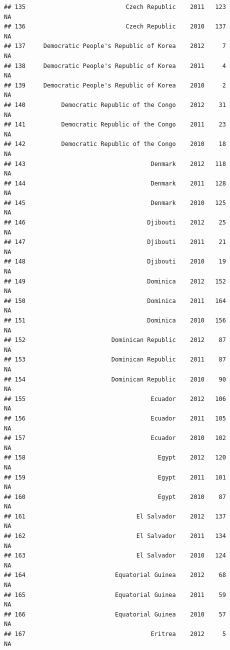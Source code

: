 \documentclass[
]{book}
\begin{document}
\begin{verbatim}
## 135                            Czech Republic    2011   123              NA
## 136                            Czech Republic    2010   137              NA
## 137     Democratic People's Republic of Korea    2012     7              NA
## 138     Democratic People's Republic of Korea    2011     4              NA
## 139     Democratic People's Republic of Korea    2010     2              NA
## 140          Democratic Republic of the Congo    2012    31              NA
## 141          Democratic Republic of the Congo    2011    23              NA
## 142          Democratic Republic of the Congo    2010    18              NA
## 143                                   Denmark    2012   118              NA
## 144                                   Denmark    2011   128              NA
## 145                                   Denmark    2010   125              NA
## 146                                  Djibouti    2012    25              NA
## 147                                  Djibouti    2011    21              NA
## 148                                  Djibouti    2010    19              NA
## 149                                  Dominica    2012   152              NA
## 150                                  Dominica    2011   164              NA
## 151                                  Dominica    2010   156              NA
## 152                        Dominican Republic    2012    87              NA
## 153                        Dominican Republic    2011    87              NA
## 154                        Dominican Republic    2010    90              NA
## 155                                   Ecuador    2012   106              NA
## 156                                   Ecuador    2011   105              NA
## 157                                   Ecuador    2010   102              NA
## 158                                     Egypt    2012   120              NA
## 159                                     Egypt    2011   101              NA
## 160                                     Egypt    2010    87              NA
## 161                               El Salvador    2012   137              NA
## 162                               El Salvador    2011   134              NA
## 163                               El Salvador    2010   124              NA
## 164                         Equatorial Guinea    2012    68              NA
## 165                         Equatorial Guinea    2011    59              NA
## 166                         Equatorial Guinea    2010    57              NA
## 167                                   Eritrea    2012     5              NA

\end{verbatim}
\end{document}
